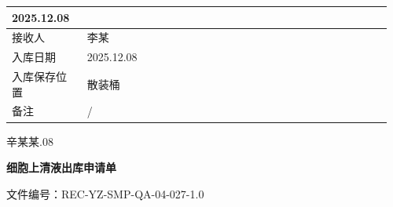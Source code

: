 \documentclass[UTF8,10pt,a4paper,fontset=fandol]{ctexart}
\newcommand{\fieldvalue}[1]{#1}
\newcommand{\handwritten}[1]{#1}
\begin{document}
\begin{tabular}{|p{0.19\linewidth}|p{0.77\linewidth}|}
\fieldvalue{\handwritten{2025.12.08}}\\
\hline
接收人 &
\fieldvalue{\handwritten{李某}}\\
\hline
入库日期 &
\fieldvalue{\handwritten{2025.12.08}}\\
\hline
入库保存位置 &
\fieldvalue{\handwritten{散装桶}}\\
\hline
备注 &
\fieldvalue{\handwritten{/}}\\
\hline
\end{tabular}

\vspace{0.4em}

\handwritten{辛某某.08}

\vspace{1em}

\begin{center}
\textbf{细胞上清液出库申请单}
\end{center}

\noindent 文件编号：REC-YZ-SMP-QA-04-027-1.0
\end{document}
